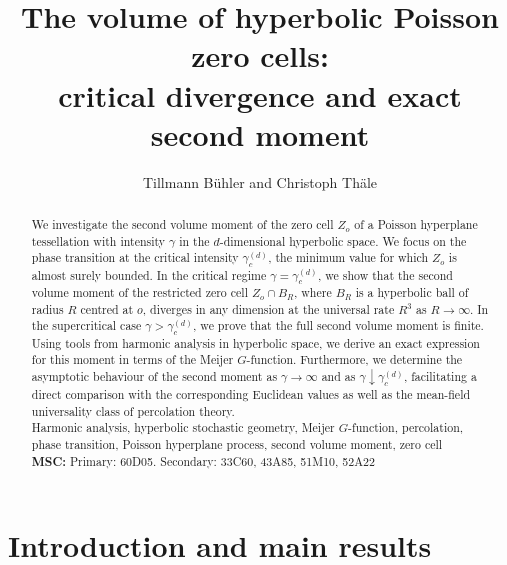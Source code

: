 \documentclass[11pt,a4paper]{article}
\theoremstyle{plain}
\theoremstyle{definition}
\theoremstyle{remark}
\begin{document}
	
	\title{\bfseries The volume of hyperbolic Poisson zero cells:\\ critical divergence and exact second moment}
	
	\author{Tillmann B\"uhler\footnotemark[1]\;\; and Christoph Th\"ale\footnotemark[2]}
	
	\date{}
	\renewcommand{\thefootnote}{\fnsymbol{footnote}}
	
	\maketitle
	
	\begin{abstract}
		\noindent
		We investigate the second volume moment of the zero cell $Z_o$ of a Poisson hyperplane tessellation with intensity $\gamma$ in the $d$-dimensional hyperbolic space. We focus on the phase transition at the critical intensity $\gamma_c^{(d)}$, the minimum value for which $Z_o$ is almost surely bounded. In the critical regime $\gamma=\gamma_c^{(d)}$, we show that the second volume moment of the restricted zero cell $Z_o \cap B_R$, where $B_R$ is a hyperbolic ball of radius $R$ centred at $o$, diverges in any dimension at the universal rate $R^3$ as $R \to \infty$. In the supercritical case $\gamma > \gamma_c^{(d)}$, we prove that the full second volume moment is finite. Using tools from harmonic analysis in hyperbolic space, we derive an exact expression for this moment in terms of the Meijer $G$-function. Furthermore, we determine the asymptotic behaviour of the second moment as $\gamma \to \infty$ and as $\gamma \downarrow \gamma_c^{(d)}$, facilitating a direct comparison with the corresponding Euclidean values as well as the mean-field universality class of percolation theory.
		\\
		
		 Harmonic analysis, hyperbolic stochastic geometry, Meijer $G$-function, percolation, phase transition, Poisson hyperplane process, second volume moment, zero cell\\
		{\bf MSC:} Primary: 60D05. Secondary: 33C60, 43A85, 51M10, 52A22
	\end{abstract}


\section{Introduction and main results}
\end{document}
